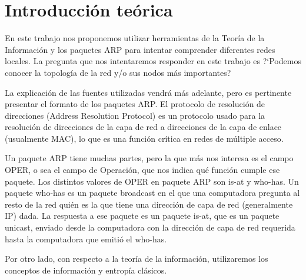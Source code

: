 \section{Introducci\'on te\'orica}

\PARstart En este trabajo nos proponemos utilizar herramientas de la Teor\'ia de la Informaci\'on y los paquetes ARP para intentar comprender diferentes redes locales. La pregunta que nos intentaremos responder en este trabajo es ?`Podemos conocer la topolog\'ia de la red y/o sus nodos m\'as importantes?

La explicaci\'on de las fuentes utilizadas vendr\'a m\'as adelante, pero es pertinente presentar el formato de los paquetes ARP. El protocolo de resoluci\'on de direcciones (Address Resolution Protocol) \cite{arp} es un protocolo usado para la resoluci\'on de direcciones de la capa de red a direcciones de la capa de enlace (usualmente MAC), lo que es una funci\'on cr\'itica en redes de m\'ultiple acceso.  

Un paquete ARP tiene muchas partes, pero la que m\'as nos interesa es el campo OPER, o sea el campo de Operaci\'on, que nos indica qu\'e funci\'on cumple ese paquete. 
Los distintos valores de OPER en paquete ARP son is-at y who-has. 
Un paquete who-has es un paquete broadcast en el que una computadora pregunta al resto de la red qui\'en es la que tiene una direcci\'on de capa de red (generalmente IP) dada.
La respuesta a ese paquete es un paquete is-at, que es un paquete unicast, enviado desde la computadora con la direcci\'on de capa de red requerida hasta la computadora que emiti\'o el who-has.

Por otro lado, con respecto a la teor\'ia de la informaci\'on, utilizaremos los conceptos de informaci\'on y entrop\'ia cl\'asicos.
